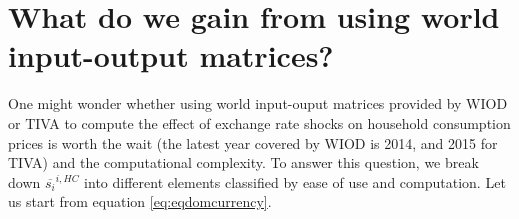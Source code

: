 \documentclass[11pt,a4paper]{article}
\begin{document}
%
%
%
%
%

\section{What do we gain from using world input-output matrices?}
One might wonder whether using world input-ouput matrices provided by WIOD or TIVA to compute the effect of exchange rate shocks on household consumption prices is worth the wait (the latest year covered by WIOD is 2014, and 2015 for TIVA) and the computational complexity. To answer this question, we break down $\overline{s_{i}}^{i,HC}$ into different elements classified by ease of use and computation. Let us start from equation \ref{eq:eqdomcurrency}.
\end{document}
